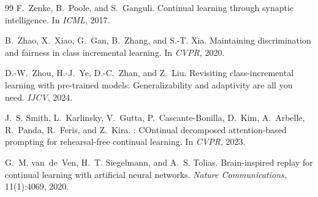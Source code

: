 \documentclass[10pt,twocolumn,letterpaper]{article}
\begin{document}
{\begin{thebibliography}{99}
F.~Zenke, B.~Poole, and S.~Ganguli.
\newblock Continual learning through synaptic intelligence.
\newblock In \textit{ICML}, 2017.

B.~Zhao, X.~Xiao, G.~Gan, B.~Zhang, and S.-T. Xia.
\newblock Maintaining discrimination and fairness in class incremental learning.
\newblock In \textit{CVPR}, 2020.

D.-W.~Zhou, H.-J.~Ye, D.-C.~Zhan, and Z.~Liu.
\newblock Revisiting class-incremental learning with pre-trained models: Generalizability and adaptivity are all you need.
\newblock \textit{IJCV}, 2024.

J.~S. Smith, L.~Karlinsky, V.~Gutta, P.~Cascante-Bonilla, D.~Kim, A.~Arbelle, R.~Panda, R.~Feris, and Z.~Kira.
: {CO}ntinual decomposed attention-based prompting for rehearsal-free continual learning.
\newblock In \textit{CVPR}, 2023.

G.~M. van~de~Ven, H.~T. Siegelmann, and A.~S. Tolias.
\newblock Brain-inspired replay for continual learning with artificial neural networks.
\newblock \textit{Nature Communications}, 11(1):4069, 2020.

\end{thebibliography}
}
\end{document}
